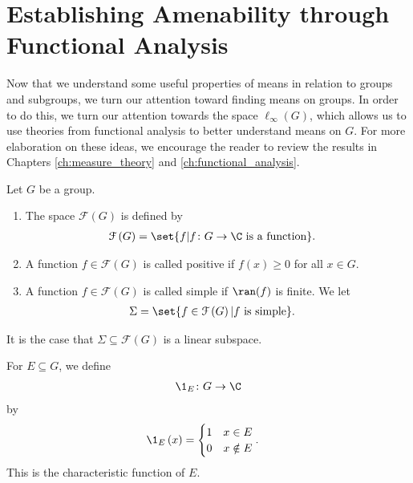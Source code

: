 \section{Establishing Amenability through Functional Analysis}\label{sec:functional_analysis_and_amenability}%
Now that we understand some useful properties of means in relation to groups and subgroups, we turn our attention toward finding means on groups. In order to do this, we turn our attention towards the space $\ell_{\infty}\left(G\right)$, which allows us to use theories from functional analysis to better understand means on $G$. For more elaboration on these ideas, we encourage the reader to review the results in Chapters \ref{ch:measure_theory} and \ref{ch:functional_analysis}.
\begin{definition}
  Let $G$ be a group.
  \begin{enumerate}[(1)]
    \item The space $\mathcal{F}\left(G\right)$ is defined by
      \begin{align*}
        \mathcal{F}\left(G\right) &= \set{f | f\colon G\rightarrow \C\text{ is a function}}.
      \end{align*}
    \item A function $f\in \mathcal{F}\left(G\right)$ is called positive if $f(x) \geq 0$ for all $x\in G$.
    \item A function $f\in \mathcal{F}\left(G\right)$ is called simple if $\ran(f)$ is finite. We let
      \begin{align*}
        \Sigma &= \set{f\in \mathcal{F}\left(G\right) | f\text{ is simple}}.
      \end{align*}
  \end{enumerate}
\end{definition}
\begin{fact}
  It is the case that $\Sigma \subseteq \mathcal{F}\left(G\right)$ is a linear subspace.
\end{fact}
\begin{definition}
  For $E\subseteq G$, we define
  \begin{align*}
    \1_{E}\colon G\rightarrow \C
  \end{align*}
  by
  \begin{align*}
    \1_{E}\left(x\right) &= \begin{cases}
      1 & x\in E\\
      0 & x\notin E
    \end{cases}.
  \end{align*}
  This is the characteristic function of $E$.
\end{definition}
